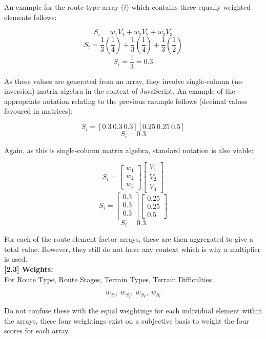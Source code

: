 \documentclass[11pt, english]{article}
\begin{document}
\newpage

	An example for the route type array ($i$) which contains three equally weighted elements follows:

	$$S_{i}=w_{1}V_{1}+w_{2}V_{2}+w_{3}V_{3}$$
	$$S_{i}=\frac{1}{3}\left(\frac{1}{4}\right)+\frac{1}{3}\left(\frac{1}{4}\right)+\frac{1}{3}\left(\frac{1}{2}\right)$$
	$$S_{i}=\frac{1}{3}=0.\textrm{\.{3}}$$
	
	As these values are generated from an array, they involve single-column (no inversion) matrix algebra in the context of JavaScript. An example of the appropriate notation relating to the previous example follows (decimal values favoured in matrices):

	$$S_{i}=\left[0.\textrm{\.{3}}\ 0.\textrm{\.{3}}\ 0.\textrm{\.{3}}\right]\left[0.25\ 0.25\ 0.5\right]$$
	$$S_{i}=0.\textrm{\.{3}}$$

	Again, as this is single-column matrix algebra, standard notation is also viable:

	$$S_{i}=\begin{bmatrix}w_{1}\\w_{2}\\w_{3}\end{bmatrix}\begin{bmatrix}V_{1}\\V_{2}\\V_{3}\end{bmatrix}$$
	$$S_{i}=\begin{bmatrix}0.\textrm{\.{3}}\\0.\textrm{\.{3}}\\0.\textrm{\.{3}}\\\end{bmatrix}\begin{bmatrix}0.25\\0.25\\0.5\end{bmatrix}$$
	$$S_{i}=0.\textrm{\.{3}}$$

	For each of the route element factor arrays, these are then aggregated to give a total value. However, they still do not have any context which is why a multiplier is used.\\

	\textbf{[2.3] Weights:}\\

	For Route Type, Route Stages, Terrain Types, Terrain Difficulties

	$$w_{S_{i}},\ w_{S_{j}},\ w_{S_{k}},\ w_{S_{l}}$$

	Do not confuse these with the equal weightings for each individual element within the arrays, these four weightings exist on a subjective basis to weight the four scores for each array.
\end{document}

